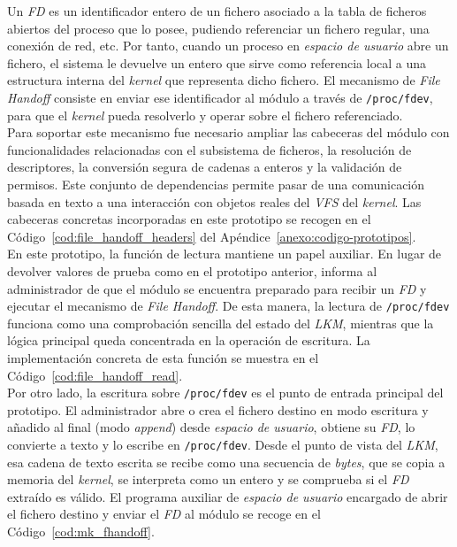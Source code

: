 Un \textit{FD} es un identificador entero de un fichero asociado a la tabla de ficheros abiertos del proceso que lo posee, pudiendo referenciar un fichero regular, una conexión de red, etc.
Por tanto, cuando un proceso en \textit{espacio de usuario} abre un fichero, el sistema le devuelve un entero que sirve como referencia local a una estructura interna del \textit{kernel} que representa dicho fichero.
El mecanismo de \textit{File Handoff} consiste en enviar ese identificador al módulo a través de \texttt{/proc/fdev}, para que el \textit{kernel} pueda resolverlo y operar sobre el fichero referenciado.\\

Para soportar este mecanismo fue necesario ampliar las cabeceras del módulo con funcionalidades relacionadas con el subsistema de ficheros, la resolución de descriptores, la conversión segura de cadenas a enteros y la validación de permisos.
Este conjunto de dependencias permite pasar de una comunicación basada en texto a una interacción con objetos reales del \textit{VFS} del \textit{kernel}.
Las cabeceras concretas incorporadas en este prototipo se recogen en el Código~\ref{cod:file_handoff_headers} del Apéndice~\ref{anexo:codigo-prototipos}.\\

En este prototipo, la función de lectura mantiene un papel auxiliar.
En lugar de devolver valores de prueba como en el prototipo anterior, informa al administrador de que el módulo se encuentra preparado para recibir un \textit{FD} y ejecutar el mecanismo de \textit{File Handoff}.
De esta manera, la lectura de \texttt{/proc/fdev} funciona como una comprobación sencilla del estado del \textit{LKM}, mientras que la lógica principal queda concentrada en la operación de escritura.
La implementación concreta de esta función se muestra en el Código~\ref{cod:file_handoff_read}.\\

Por otro lado, la escritura sobre \texttt{/proc/fdev} es el punto de entrada principal del prototipo.
El administrador abre o crea el fichero destino en modo escritura y añadido al final (modo \textit{append}) desde \textit{espacio de usuario}, obtiene su \textit{FD}, lo convierte a texto y lo escribe en \texttt{/proc/fdev}.
Desde el punto de vista del \textit{LKM}, esa cadena de texto escrita se recibe como una secuencia de \textit{bytes}, que se copia a memoria del \textit{kernel}, se interpreta como un entero y se comprueba si el \textit{FD} extraído es válido.
El programa auxiliar de \textit{espacio de usuario} encargado de abrir el fichero destino y enviar el \textit{FD} al módulo se recoge en el Código~\ref{cod:mk_fhandoff}.\\

